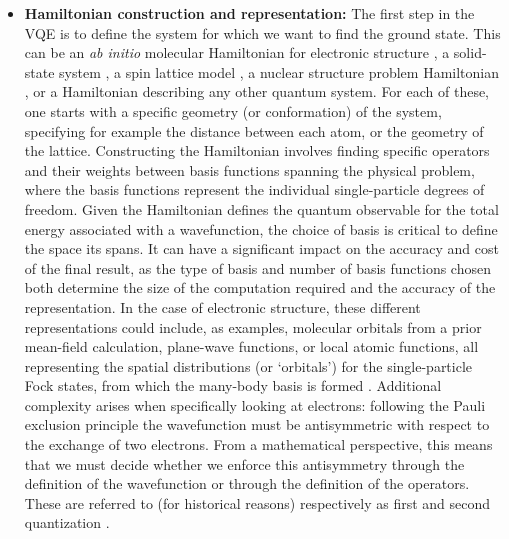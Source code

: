 \begin{itemize}
    \item \textbf{Hamiltonian construction and representation:} The first step in the VQE is to define the system for which we want to find the ground state. This can be an \textit{ab initio} molecular Hamiltonian for electronic structure \cite{Parr1990, Friesner2005, Szabo1996, Jensen2017}, a solid-state system \cite{nemoshkalenko1998computational, Martin2004, Marder2010, Continentino2021}, a spin lattice model \cite{Clark1997}, a nuclear structure problem Hamiltonian \cite{Romero2022}, or a Hamiltonian describing any other quantum system. For each of these, one starts with a specific geometry (or conformation) of the system, specifying for example the distance between each atom, or the geometry of the lattice. Constructing the Hamiltonian involves finding specific operators and their weights between basis functions spanning the physical problem, where the basis functions represent the individual single-particle degrees of freedom. Given the Hamiltonian defines the quantum observable for the total energy associated with a wavefunction, the choice of basis is critical to define the space its spans. It can have a significant impact on the accuracy and cost of the final result, as the type of basis and number of basis functions chosen both determine the size of the computation required and the accuracy of the representation. %
    In the case of electronic structure, these different representations could include, as examples, molecular orbitals from a prior mean-field calculation, plane-wave functions, or local atomic functions, all representing the spatial distributions (or `orbitals') for the single-particle Fock states, from which the many-body basis is formed \cite{Szabo1996}. 
    Additional complexity arises when specifically looking at electrons: following the Pauli exclusion principle \cite{Pauli1925, griffiths2005introduction} the wavefunction must be antisymmetric with respect to the exchange of two electrons. From a mathematical perspective, this means that we must decide whether we enforce this antisymmetry through the definition of the wavefunction or through the definition of the operators. These are referred to (for historical reasons) respectively as first and second quantization \cite{Szabo1996}.

\end{itemize}

